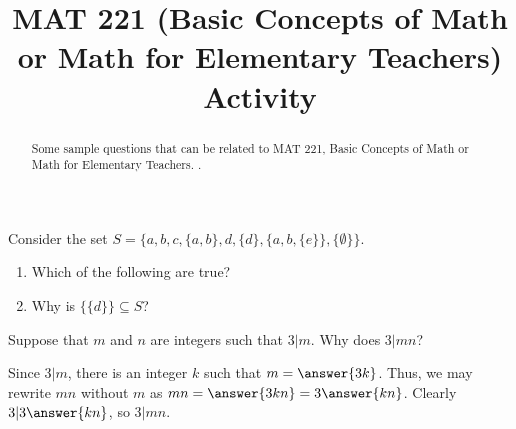 \documentclass{ximera}
\title{MAT 221 (Basic Concepts of Math or Math for Elementary Teachers) Activity}
\begin{document}
      
\begin{abstract}
      
Some sample questions that can be related to MAT 221, Basic Concepts of Math or Math for Elementary Teachers.
.
      
\end{abstract}
      
\maketitle
      
      
\begin{question}
Consider the set $S=\{a,b,c,\{a,b\}, d, \{d\}, \{a,b,\{e\}\}, \{\emptyset\}\}$.  

\begin{enumerate}
\item Which of the following are true?

  \begin{selectAll}

  
  
    \end{selectAll}

\item Why is $\{\{d\}\}\subseteq S$?
\begin{multipleChoice}
\end{multipleChoice}

\end{enumerate}



\end{question}


\begin{question}
Suppose that $m$ and $n$ are integers such that $3|m$.  Why does $3|mn$?
\begin{explanation}
Since $3|m$, there is an integer $k$ such that $m=\answer{3k}$.  Thus, we may rewrite $mn$ without $m$ as $mn=\answer{3kn}=3\answer{kn}$.  Clearly $3|3\answer{kn}$, so $3|mn$.
\end{explanation}
\end{question}
\end{document}
